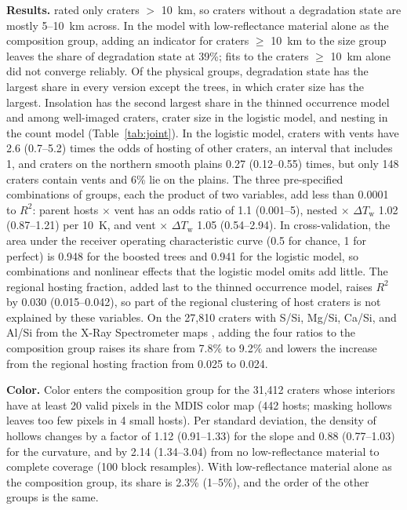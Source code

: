 \documentclass{planetary}
\begin{document}
\textbf{Results.} \textcite{herrick2018} rated only craters $>$ 10~km, so craters without a degradation state are mostly 5--10~km across. In the model with low-reflectance material alone as the composition group, adding an indicator for craters $\geq$ 10~km to the size group leaves the share of degradation state at 39\%; fits to the craters $\geq$ 10~km alone did not converge reliably. Of the physical groups, degradation state has the largest share in every version except the trees, in which crater size has the largest. Insolation has the second largest share in the thinned occurrence model and among well-imaged craters, crater size in the logistic model, and nesting in the count model (Table~\ref{tab:joint}). In the logistic model, craters with vents have 2.6 (0.7--5.2) times the odds of hosting of other craters, an interval that includes 1, and craters on the northern smooth plains 0.27 (0.12--0.55) times, but only 148 craters contain vents and 6\% lie on the plains. The three pre-specified combinations of groups, each the product of two variables, add less than 0.0001 to $R^2$: parent hosts $\times$ vent has an odds ratio of 1.1 (0.001--5), nested $\times$ $\Delta T_\mathrm{w}$ 1.02 (0.87--1.21) per 10~K, and vent $\times$ $\Delta T_\mathrm{w}$ 1.05 (0.54--2.94). In cross-validation, the area under the receiver operating characteristic curve (0.5 for chance, 1 for perfect) is 0.948 for the boosted trees and 0.941 for the logistic model, so combinations and nonlinear effects that the logistic model omits add little. The regional hosting fraction, added last to the thinned occurrence model, raises $R^2$ by 0.030 (0.015--0.042), so part of the regional clustering of host craters is not explained by these variables. On the 27,810 craters with S/Si, Mg/Si, Ca/Si, and Al/Si from the X-Ray Spectrometer maps \parencite{nittler2020}, adding the four ratios to the composition group raises its share from 7.8\% to 9.2\% and lowers the increase from the regional hosting fraction from 0.025 to 0.024.

\textbf{Color.} Color enters the composition group for the 31,412 craters whose interiors have at least 20 valid pixels in the MDIS color map (442 hosts; masking hollows leaves too few pixels in 4 small hosts). Per standard deviation, the density of hollows changes by a factor of 1.12 (0.91--1.33) for the slope and 0.88 (0.77--1.03) for the curvature, and by 2.14 (1.34--3.04) from no low-reflectance material to complete coverage (100 block resamples). With low-reflectance material alone as the composition group, its share is 2.3\% (1--5\%), and the order of the other groups is the same.
\end{document}
